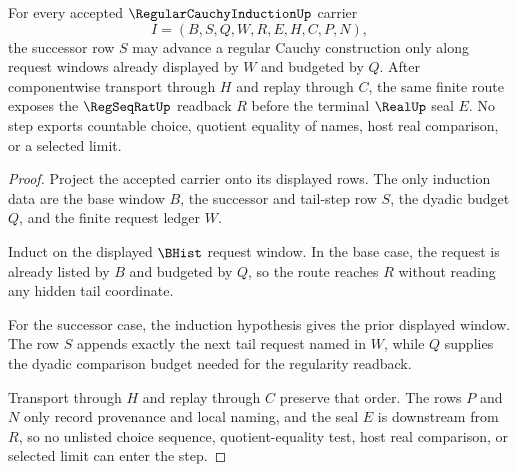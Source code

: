 \begin{theorem}
\label{thm:regular-cauchy-induction-step-soundness}
For every accepted $\RegularCauchyInductionUp$ carrier
$$
I=(B,S,Q,W,R,E,H,C,P,N),
$$
the successor row $S$ may advance a regular Cauchy construction only along request windows already displayed by $W$ and budgeted by $Q$. After componentwise transport through $H$ and replay through $C$, the same finite route exposes the $\RegSeqRatUp$ readback $R$ before the terminal $\RealUp$ seal $E$. No step exports countable choice, quotient equality of names, host real comparison, or a selected limit.
\end{theorem}
\begin{proof}
Project the accepted carrier onto its displayed rows. The only induction data are the base window $B$, the successor and tail-step row $S$, the dyadic budget $Q$, and the finite request ledger $W$.

Induct on the displayed $\BHist$ request window. In the base case, the request is already listed by $B$ and budgeted by $Q$, so the route reaches $R$ without reading any hidden tail coordinate.

For the successor case, the induction hypothesis gives the prior displayed window. The row $S$ appends exactly the next tail request named in $W$, while $Q$ supplies the dyadic comparison budget needed for the regularity readback.

Transport through $H$ and replay through $C$ preserve that order. The rows $P$ and $N$ only record provenance and local naming, and the seal $E$ is downstream from $R$, so no unlisted choice sequence, quotient-equality test, host real comparison, or selected limit can enter the step.
\end{proof}

